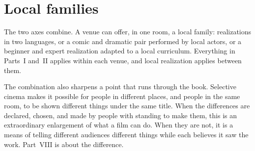 \section{Local families}

The two axes combine. A venue can offer, in one room, a local family: realizations in two languages, or a comic and dramatic pair performed by local actors, or a beginner and expert realization adapted to a local curriculum. Everything in Parts~I and~II applies within each venue, and local realization applies between them.

The combination also sharpens a point that runs through the book. Selective cinema makes it possible for people in different places, and people in the same room, to be shown different things under the same title. When the differences are declared, chosen, and made by people with standing to make them, this is an extraordinary enlargement of what a film can do. When they are not, it is a means of telling different audiences different things while each believes it saw the work. Part~VIII is about the difference.
